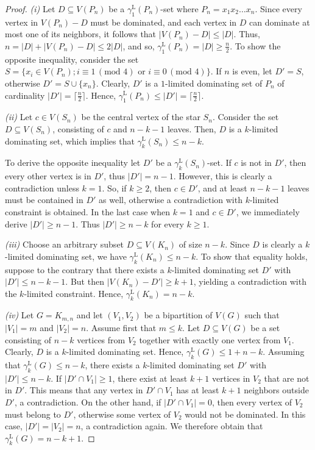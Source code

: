 \documentclass[11pt]{article}
\newcommand{\gammakL}{\gamma_k^{\mathrm L}}
\newcommand{\gammaenaL}{\gamma_1^{\mathrm L}}
\begin{document}
\begin{proof}
\textit{(i)} Let $D\subseteq V(P_n)$ be a $\gammaenaL(P_n)$-set where $P_n=x_1x_2\ldots x_n$. Since every vertex in $V(P_n)-D$ must be dominated, and each vertex in $D$ can dominate at most one of its neighbors, it follows that $|V(P_n)-D|\leq|D|$. Thus, $n=|D|+|V(P_n)-D|\leq2|D|$, and so, $\gammaenaL(P_n)=|D|\geq\frac{n}{2}$. To show the opposite inequality, 
consider the set $S=\{x_i\in V(P_n); i\equiv 1\,(\text{mod }4)\text{ or }i\equiv 0\,(\text{mod }4)\}$. If $n$ is even, let $D'=S$, otherwise $D'=S\cup\{x_n\}$.  Clearly, $D'$ is a $1$-limited dominating set of $P_n$ of cardinality $|D'|=\lceil\frac n2\rceil$. Hence, $\gammaenaL(P_n)\leq|D'|= \lceil\frac n2\rceil$.


 
\medskip
\textit{(ii)} Let $c\in V(S_n)$ be the central vertex of the star $S_n$. Consider the set $D\subseteq V(S_n)$, consisting of $c$ and $n-k-1$ leaves. Then, $D$ is a $k$-limited dominating set, which implies that $\gammakL (S_n)\leq n-k$.

To derive the opposite inequality let $D'$ be a $\gammakL(S_n)$-set. If $c$ is not in $D'$, then every other vertex is in $D'$, thus $|D'|=n-1$. However, this is clearly a contradiction unless $k=1$. So, if $k\geq 2$, then $c\in D'$, and at least $n-k-1$ leaves must be contained in $D'$ as well, otherwise a contradiction with $k$-limited constraint is obtained. In the last case when $k=1$ and $c\in D'$, we immediately derive $|D'|\geq n-1$. Thus $|D'|\geq n-k$ for every $k\geq 1$.


\medskip
\textit{(iii)} Choose an arbitrary subset $D \subseteq V(K_n)$ of size $n - k$. Since $D$ is clearly a $k$-limited dominating set, we have
$\gammakL(K_n)\leq  n-k$. To show that equality holds, suppose to the contrary that 
there exists a $k$-limited dominating set $D'$ with $|D'| \leq n - k - 1$. But then $|V(K_n) - D'| \geq k + 1$, yielding a contradiction  with the $k$-limited constraint. Hence, $\gammakL(K_n) = n - k$. 

\medskip

\textit{(iv)} Let $G = K_{m,n}$ and let $(V_1,V_2)$ be a bipartition of $V(G)$ such that $|V_1| = m$ and $|V_2| = n$. 
Assume first that $m \leq k$. Let $D \subseteq V(G)$ be a set consisting of $n-k$ vertices from $V_2$ together with exactly one vertex from $V_1$. Clearly, $D$ is a $k$-limited dominating set. Hence, $\gammakL(G) \leq 1+n-k$. Assuming that $\gammakL(G) \leq n-k$, there exists a $k$-limited dominating set $D'$ with $|D'| \leq n-k$. If $ |D'\cap V_1|\geq1$, there exist at least $k+1$ vertices in $V_2$ that are not in $D'$. This means that any vertex in $ D'\cap V_1$ has at least $k+1$ neighbors outside $D'$, a contradiction. On the other hand, if $|D' \cap V_1| = 0 $, then every vertex of $V_2$ must belong to $D'$, otherwise some vertex of $V_2$ would not be dominated. In this case, $|D'| = |V_2| = n$, a contradiction again. We therefore obtain that $\gammakL(G) = n-k+1$.


\end{proof}
\end{document}
